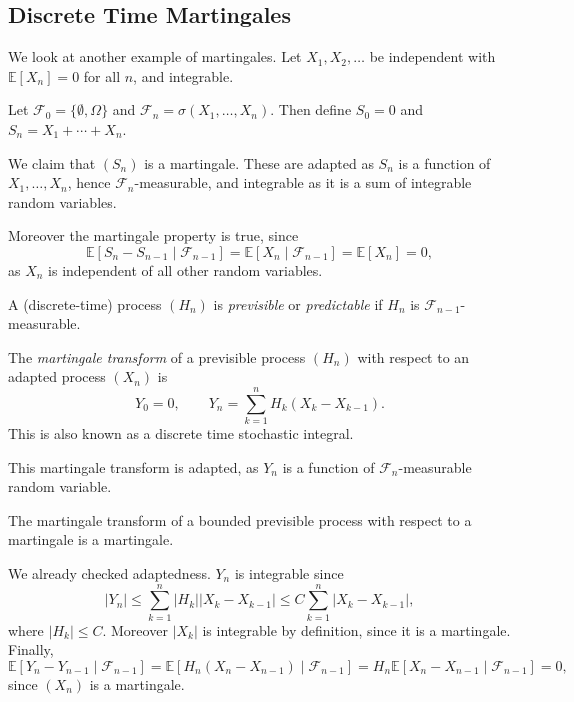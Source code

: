 \documentclass[12pt]{article}
\begin{document}
\subsection{Discrete Time Martingales}
\label{sub:dtm}

We look at another example of martingales. Let $X_1, X_2, \ldots$ be independent with $\mathbb{E}[X_n] = 0$ for all $n$, and integrable.

Let $\mathcal{F}_0 = \{\emptyset, \Omega\}$ and $\mathcal{F}_n = \sigma(X_1, \ldots, X_n)$. Then define $S_0 = 0$ and $S_n = X_1 + \cdots + X_n$.

We claim that $(S_n)$ is a martingale. These are adapted as $S_n$ is a function of $X_1, \ldots, X_n$, hence $\mathcal{F}_n$-measurable, and integrable as it is a sum of integrable random variables.

Moreover the martingale property is true, since
\[
\mathbb{E}[S_n - S_{n-1} \mid \mathcal{F}_{n-1}] = \mathbb{E}[X_n \mid \mathcal{F}_{n-1}] = \mathbb{E}[X_n] = 0,
\]
as $X_n$ is independent of all other random variables.

\begin{definition}
	A (discrete-time) process $(H_n)$ is \emph{previsible} or \emph{predictable} if $H_n$ is $\mathcal{F}_{n-1}$-measurable.
\end{definition}

\begin{definition}
	The \emph{martingale transform} of a previsible process $(H_n)$ with respect to an adapted process $(X_n)$ is
	\[
	Y_0 = 0, \qquad Y_n = \sum_{k = 1}^n H_k(X_k - X_{k-1}).
	\]
	This is also known as a discrete time stochastic integral.
\end{definition}

This martingale transform is adapted, as $Y_n$ is a function of $\mathcal{F}_n$-measurable random variable.

\begin{theorem}
	The martingale transform of a bounded previsible process with respect to a martingale is a martingale.
\end{theorem}

\begin{proofbox}
	We already checked adaptedness. $Y_n$ is integrable since
	\[
	|Y_n| \leq \sum_{k = 1}^n |H_k| |X_k - X_{k-1}| \leq C \sum_{k = 1}^n |X_k - X_{k-1}|,
	\]
	where $|H_k| \leq C$. Moreover $|X_k|$ is integrable by definition, since it is a martingale. Finally,
	\[
	\mathbb{E}[Y_n - Y_{n-1} \mid \mathcal{F}_{n-1}] = \mathbb{E}[H_n(X_n - X_{n-1}) \mid \mathcal{F}_{n-1}] = H_n \mathbb{E}[X_n - X_{n-1} \mid \mathcal{F}_{n-1}] = 0,
	\]
	since $(X_n)$ is a martingale.
\end{proofbox}
\end{document}
